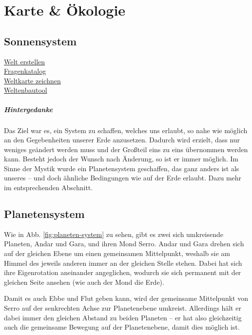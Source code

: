 \chapter{Karte \& Ökologie}
\section{Sonnensystem}
\href{http://www.weltenbau-wissen.de/sci-fi-erschaffen-fantasy-welt-erstellen-einstieg/}{Welt erstellen} \\
\href{http://www.weltenbau-wissen.de/2015/10/weltenbau-fragenkatalog-oekologie-biologie/}{Fragenkatalog} \\
\href{http://www.weltenbau-wissen.de/2015/01/weltenbau-mit-weltkarte-karte-zeichnen-tutorial/}{Weltkarte zeichnen} \\
\href{https://inkarnate.com/}{Weltenbautool}

\paragraph{Hintergedanke}
Das Ziel war es, ein System zu schaffen, welches uns erlaubt, so nahe wie möglich an den Gegebenheiten unserer Erde anzusetzen.
Dadurch wird erzielt, dass nur weniges geändert werden muss und der Großteil eins zu eins übernommen werden kann.
Besteht jedoch der Wunsch nach Änderung, so ist er immer möglich.
Im Sinne der Mystik wurde ein Planetensystem geschaffen, das ganz anders ist als unseres -- und doch ähnliche Bedingungen wie auf der Erde erlaubt.
Dazu mehr im entsprechenden Abschnitt.




\section{Planetensystem}
Wie in Abb. \ref{fig:planeten-system} zu sehen, gibt es zwei sich umkreisende Planeten, Andar und Gara, und ihren Mond Serro.
Andar und Gara drehen sich auf der gleichen Ebene um einen gemeinsamen Mittelpunkt, weshalb sie am Himmel des jeweils anderen immer an der gleichen Stelle stehen.
Dabei hat sich ihre Eigenrotation aneinander angeglichen, wodurch sie sich permanent mit der gleichen Seite ansehen (wie auch der Mond die Erde).

Damit es auch Ebbe und Flut geben kann, wird der gemeinsame Mittelpunkt von Serro auf der senkrechten Achse zur Planetenebene umkreist. 
Allerdings hält er dabei immer den gleichen Abstand zu beiden Planeten -- er hat also gleichzeitig auch die gemeinsame Bewegung auf der Planetenebene, damit dies möglich ist.

